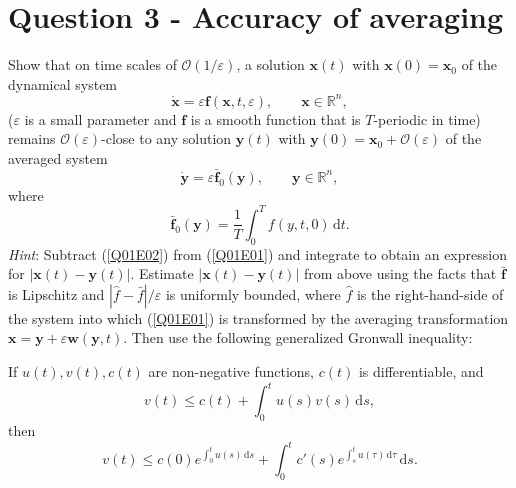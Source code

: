 \documentclass[twoside,10pt,a4paper]{article}
\begin{document}
\section*{Question 3 - Accuracy of averaging}
Show that on time scales of $\mathcal{O}(1/\varepsilon)$, a solution $\mathbf{x}(t)$ with $\mathbf{x}(0) = \mathbf{x}_0$ of the dynamical system
\begin{equation}\label{Q01E01}
	\dot{\mathbf{x}} = \varepsilon \mathbf{f}(\mathbf{x},t, \varepsilon), \qquad \mathbf{x} \in \mathbb{R}^n,
\end{equation}
($\varepsilon$ is a small parameter and $\mathbf{f}$ is a smooth function that is $T$-periodic in time) remains $\mathcal{O}(\varepsilon)$-close to any solution $\mathbf{y}(t)$ with $\mathbf{y}(0) = \mathbf{x}_0 + \mathcal{O}(\varepsilon)$ of the averaged system
\begin{equation}\label{Q01E02}
	\dot{\mathbf{y}} = \varepsilon \bar{\mathbf{f}}_0 (\mathbf{y}), \qquad \mathbf{y} \in \mathbb{R}^n,
\end{equation}
where
\begin{equation*}
	\bar{\mathbf{f}}_0 (\mathbf{y}) = \frac{1}{T} \int_0^T f(y,t,0) \, \text{d}t.
\end{equation*}
\textit{Hint}: Subtract (\ref{Q01E02}) from (\ref{Q01E01}) and integrate to obtain an expression for $|\mathbf{x}(t) - \mathbf{y}(t)|$. Estimate $|\mathbf{x}(t) - \mathbf{y}(t)|$ from above using the facts that $\bar{\mathbf{f}}$ is Lipschitz and $|\hat{f} - \bar{f}|/\varepsilon$ is uniformly bounded, where $\hat{f}$ is the right-hand-side of the system into which (\ref{Q01E01}) is transformed by the averaging transformation $\mathbf{x} = \mathbf{y} + \varepsilon \mathbf{w}(\mathbf{y},t)$. Then use the following generalized Gronwall inequality:

If $u(t), v(t), c(t)$ are non-negative functions, $c(t)$ is differentiable, and
\begin{equation*}
	v(t) \leq c(t) + \int_0^t u(s)v(s) \, \text{d}s,
\end{equation*}
then
\begin{equation*}
	v(t) \leq c(0) e^{\int_0^t u(s)\, \text{d}s} + \int_0^t c'(s)e^{\int_s^t u(\tau)\,\text{d}\tau}\, \text{d}s.
\end{equation*}
\end{document}
